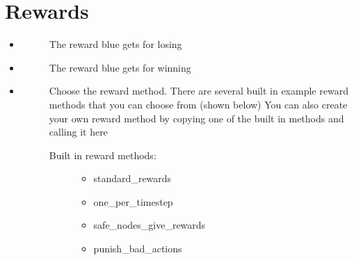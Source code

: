 \documentclass[letterpaper,10pt,english]{sphinxmanual}
\begin{document}
\section{Rewards}
\label{\detokenize{source/config_file:rewards}}\begin{itemize}
\item {} \begin{description}
\item[{}] \leavevmode
\sphinxAtStartPar
The reward blue gets for losing

\end{description}

\item {} \begin{description}
\item[{}] \leavevmode
\sphinxAtStartPar
The reward blue gets for winning

\end{description}

\item {} \begin{description}
\item[{}] \leavevmode
\sphinxAtStartPar
Choose the reward method. There are several built in example reward methods that you can choose from (shown below) You can also create your own reward method by copying one of the built in methods and calling it here
\begin{description}
\item[{Built in reward methods:}] \leavevmode\begin{itemize}
\item {}
\sphinxAtStartPar
standard\_rewards

\item {}
\sphinxAtStartPar
one\_per\_timestep

\item {}
\sphinxAtStartPar
safe\_nodes\_give\_rewards

\item {}
\sphinxAtStartPar
punish\_bad\_actions

\end{itemize}

\end{description}

\end{description}

\end{itemize}
\end{document}
